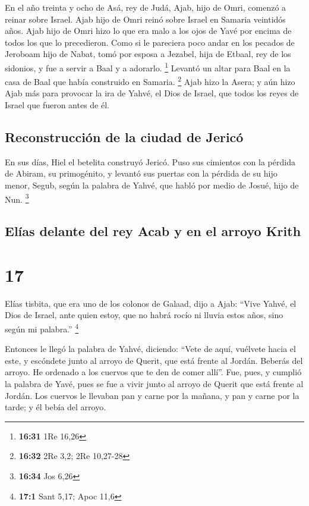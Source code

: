  En el año treinta y ocho de Asá, rey de Judá, Ajab, hijo
de Omri, comenzó a reinar sobre Israel. Ajab hijo de Omri reinó sobre
Israel en Samaria veintidós años.  Ajab hijo de Omri hizo
lo que era malo a los ojos de Yavé por encima de todos los que lo
precedieron.  Como si le pareciera poco andar en los
pecados de Jeroboam hijo de Nabat, tomó por esposa a Jezabel, hija de
Etbaal, rey de los sidonios, y fue a servir a Baal y a adorarlo.
\footnote{\textbf{16:31} 1Re 16,26}  Levantó un altar
para Baal en la casa de Baal que había construido en Samaria.
\footnote{\textbf{16:32} 2Re 3,2; 2Re 10,27-28}  Ajab
hizo la Asera; y aún hizo Ajab más para provocar la ira de Yahvé, el
Dios de Israel, que todos los reyes de Israel que fueron antes de él.

\hypertarget{reconstrucciuxf3n-de-la-ciudad-de-jericuxf3}{%
\subsection{Reconstrucción de la ciudad de
Jericó}\label{reconstrucciuxf3n-de-la-ciudad-de-jericuxf3}}

 En sus días, Hiel el betelita construyó Jericó. Puso sus
cimientos con la pérdida de Abiram, su primogénito, y levantó sus
puertas con la pérdida de su hijo menor, Segub, según la palabra de
Yahvé, que habló por medio de Josué, hijo de Nun. \footnote{\textbf{16:34}
  Jos 6,26}

\hypertarget{eluxedas-delante-del-rey-acab-y-en-el-arroyo-krith}{%
\subsection{Elías delante del rey Acab y en el arroyo
Krith}\label{eluxedas-delante-del-rey-acab-y-en-el-arroyo-krith}}

\hypertarget{section-16}{%
\section{17}\label{section-16}}

 Elías tisbita, que era uno de los colonos de Galaad, dijo
a Ajab: ``Vive Yahvé, el Dios de Israel, ante quien estoy, que no habrá
rocío ni lluvia estos años, sino según mi palabra.'' \footnote{\textbf{17:1}
  Sant 5,17; Apoc 11,6}

 Entonces le llegó la palabra de Yahvé, diciendo:
 ``Vete de aquí, vuélvete hacia el este, y escóndete junto
al arroyo de Querit, que está frente al Jordán.  Beberás
del arroyo. He ordenado a los cuervos que te den de comer allí''.
 Fue, pues, y cumplió la palabra de Yavé, pues se fue a
vivir junto al arroyo de Querit que está frente al Jordán.
 Los cuervos le llevaban pan y carne por la mañana, y pan
y carne por la tarde; y él bebía del arroyo.

